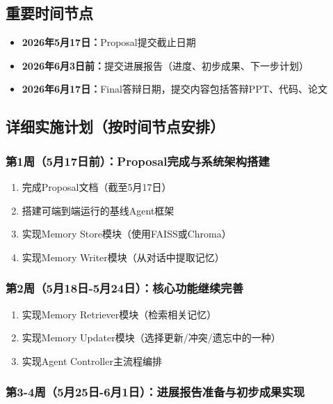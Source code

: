 \documentclass[11pt]{article}
\begin{document}
\subsection{重要时间节点}

\begin{itemize}
\item \textbf{2026年5月17日：}Proposal提交截止日期
\item \textbf{2026年6月3日前：}提交进展报告（进度、初步成果、下一步计划）
\item \textbf{2026年6月17日：}Final答辩日期，提交内容包括答辩PPT、代码、论文
\end{itemize}

\subsection{详细实施计划（按时间节点安排）}

\subsubsection{第1周（5月17日前）：Proposal完成与系统架构搭建}

\begin{enumerate}
\item 完成Proposal文档（截至5月17日）
\item 搭建可端到端运行的基线Agent框架
\item 实现Memory Store模块（使用FAISS或Chroma）
\item 实现Memory Writer模块（从对话中提取记忆）
\end{enumerate}

\subsubsection{第2周（5月18日-5月24日）：核心功能继续完善}

\begin{enumerate}
\item 实现Memory Retriever模块（检索相关记忆）
\item 实现Memory Updater模块（选择更新/冲突/遗忘中的一种）
\item 实现Agent Controller主流程编排
\end{enumerate}

\subsubsection{第3-4周（5月25日-6月1日）：进展报告准备与初步成果实现}
\end{document}
